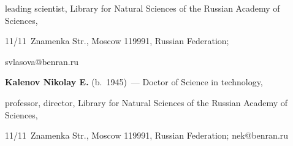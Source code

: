 leading scientist, Library for Natural Sciences of the Russian Academy of Sciences, 


11/11~Znamenka Str., Moscow 119991, Russian Federation; 


\mbox{svlasova@benran.ru}





\vspace*{3pt}





\noindent


\textbf{Kalenov Nikolay E.} (b.\ 1945)~--- Doctor of Science in technology, 


professor, director, Library for Natural Sciences of the Russian Academy of Sciences, 


11/11~Znamenka Str., Moscow 119991, Russian Federation; \mbox{nek@benran.ru}





\label{end\stat}








\renewcommand{\bibname}{\protect\rm Литература}


